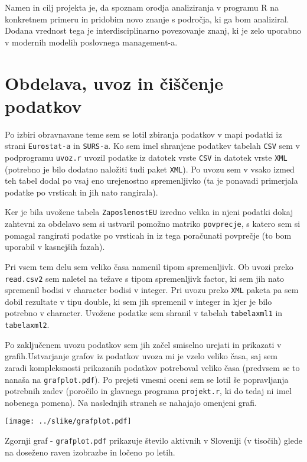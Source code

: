 \documentclass[11pt,a4paper]{article}
\begin{document}
Namen in cilj projekta je, da spoznam orodja analiziranja v programu R na konkretnem primeru in pridobim novo znanje s področja, ki ga bom analiziral. Dodana vrednost tega je interdisciplinarno povezovanje znanj, ki je zelo uporabno v modernih modelih poslovnega management-a. 
\pagebreak
\section{Obdelava, uvoz in čiščenje podatkov}

Po izbiri obravnavane teme sem se lotil zbiranja podatkov v mapi podatki iz strani \verb|Eurostat-a| in \verb|SURS-a|. Ko sem imel shranjene podatkev tabelah \verb|CSV| sem v podprogramu \verb|uvoz.r| uvozil podatke iz datotek vrste \verb|CSV| in datotek vrste \verb|XML| (potrebno je bilo dodatno naložiti tudi paket \verb|XML|). Po uvozu sem v vsako izmed teh tabel dodal po vsaj eno urejenostno spremenljivko (ta je ponavadi primerjala podatke po vrsticah in jih nato rangirala). 

Ker je bila uvožene tabela \verb|ZaposlenostEU| izredno velika in njeni podatki dokaj zahtevni za obdelavo sem si ustvaril pomožno matriko \verb|povprecje|, s katero sem si pomagal rangirati podatke po vrsticah in iz tega poračunati povprečje (to bom uporabil v kasnejših fazah). 

Pri vsem tem delu sem veliko časa namenil tipom spremenljivk. Ob uvozi preko \verb|read.csv2| sem naletel na težave s tipom spremenljivk factor, ki sem jih nato spremenil bodisi v character bodisi v integer. Pri uvozu preko \verb|XML| paketa pa sem dobil rezultate v tipu double, ki sem jih spremenil v integer in kjer je bilo potrebno v character. Uvožene podatke sem shranil v tabelah \verb|tabelaxml1| in \verb|tabelaxml2|. 

Po zaključenem uvozu podatkov sem jih začel smiselno urejati in prikazati v grafih.Ustvarjanje grafov iz podatkov uvoza mi je vzelo veliko časa, saj sem zaradi kompleksnosti prikazanih podatkov potreboval veliko časa (pred\-vsem se to nanaša na \verb|grafplot.pdf|). Po prejeti vmesni oceni sem se lotil še popravljanja potrebnih zadev (poročilo in glavnega programa \verb|projekt.r|, ki do tedaj ni imel nobenega pomena). Na naslednjih straneh se nahajajo omenjeni grafi. 

\texttt{[image: ../slike/grafplot.pdf]}

Zgornji graf - \verb|grafplot.pdf| prikazuje šte\-vilo aktivnih v Sloveniji (v tisočih) glede na doseženo raven izobrazbe in ločeno po letih. 
\end{document}
